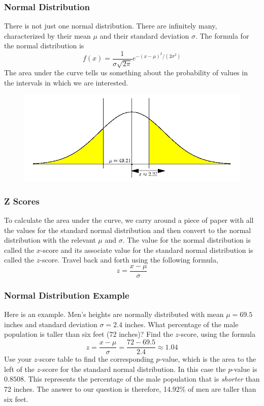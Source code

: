 \documentclass[xcolor=dvipsnames]{beamer}
\begin{document}
\begin{frame}
  \frametitle{Normal Distribution}
There is not just one normal distribution. There are infinitely many,
characterized by their \alert{mean $\mu$} and their \alert{standard deviation
$\sigma$}. The formula for the normal distribution is
\begin{equation}
  \label{eq:aitoolah}
  f(x)=\frac{1}{\sigma\sqrt{2\pi}}e^{-(x-\mu)^{2}/(2\sigma^{2})}
\end{equation}
The area under the curve tells us something about the probability of
values in the intervals in which we are interested.
  \begin{figure}[h]
    \includegraphics[scale=.4]{./qfour.png}
  \end{figure}
\end{frame}

\begin{frame}
  \frametitle{Z Scores}
To calculate the area under the curve, we carry around a piece of
paper with all the values for the \alert{standard normal distribution}
and then convert to the normal distribution with the relevant $\mu$
and $\sigma$. The value for the normal distribution is called the
\alert{$x$-score} and its associate value for the standard normal distribution
is called the \alert{$z$-score}. Travel back and forth using the following
formula,
\begin{equation}
  \label{eq:uotoogoo}
  z=\frac{x-\mu}{\sigma}
\end{equation}
\end{frame}

\begin{frame}
  \frametitle{Normal Distribution Example}
Here is an example. Men's heights are normally distributed with mean
$\mu=69.5$ inches and standard deviation $\sigma=2.4$ inches. What
percentage of the male population is taller than six feet (72 inches)?
Find the $z$-score, using the formula
\begin{equation}
  \label{eq:igutheib}
  z=\frac{x-\mu}{\sigma}=\frac{72-69.5}{2.4}\approx{}1.04
\end{equation}
Use your $z$-score table to find the corresponding \alert{$p$-value},
which is the area to the left of the $z$-score for the standard normal
distribution. In this case the $p$-value is $0.8508$. This represents
the percentage of the male population that is \emph{shorter} than 72
inches. The answer to our question is therefore, 14.92\% of men are
taller than six feet.
\end{frame}
\end{document}
